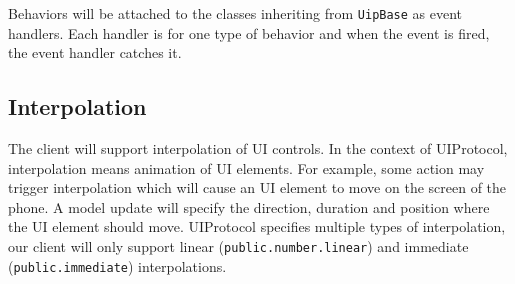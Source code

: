 Behaviors will be attached to the classes inheriting from \texttt{UipBase} as event handlers. Each handler is for one type of behavior and when the event is fired, the event handler catches it.

\subsection{Interpolation}
The client will support interpolation of UI controls. In the context of UIProtocol, interpolation means animation of UI elements. For example, some action may trigger interpolation which will cause an UI element to move on the screen of the phone. A model update will specify the direction, duration and position where the UI element should move. UIProtocol specifies multiple types of interpolation, our client will only support linear (\texttt{public.number.linear}) and immediate (\texttt{public.immediate}) interpolations.


